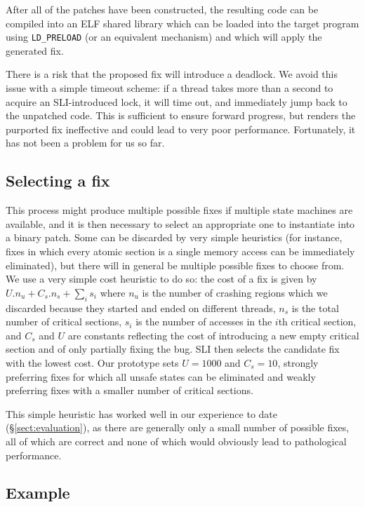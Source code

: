 \documentclass[10pt,letter,twocolumn]{sigplanconf}
\begin{document}
After all of the patches have been constructed, the resulting code can
be compiled into an ELF shared library which can be loaded into the
target program using \verb|LD_PRELOAD| (or an equivalent mechanism)
and which will apply the generated fix.  

There is a risk that the proposed fix will introduce a deadlock.  We
avoid this issue with a simple timeout scheme: if a thread takes more
than a second to acquire an SLI-introduced lock, it will time out, and
immediately jump back to the unpatched code.  This is sufficient to
ensure forward progress, but renders the purported fix ineffective and
could lead to very poor performance.  Fortunately, it has not been a
problem for us so far.

\subsection{Selecting a fix}
\label{sect:selectfix}

This process might produce multiple possible fixes if multiple state
machines are available, and it is then necessary to select an
appropriate one to instantiate into a binary patch.  Some can be
discarded by very simple heuristics (for instance, fixes in which
every atomic section is a single memory access can be immediately
eliminated), but there will in general be multiple possible fixes to
choose from.  We use a very simple cost heuristic to do so: the cost
of a fix is given by $U.n_u + C_s.n_s + {\sum_{i}}s_i$ where $n_u$ is
the number of crashing regions which we discarded because they started
and ended on different threads, $n_s$ is the total number of critical
sections, $s_i$ is the number of accesses in the $i$th critical
section, and $C_s$ and $U$ are constants reflecting the cost of
introducing a new empty critical section and of only partially fixing
the bug.  SLI then selects the candidate fix with the lowest cost.
Our prototype sets $U=1000$ and $C_s=10$, strongly preferring fixes
for which all unsafe states can be eliminated and weakly preferring
fixes with a smaller number of critical sections.

This simple heuristic has worked well in our experience to date
(\S\ref{sect:evaluation}), as there are generally only a small number
of possible fixes, all of which are correct and none of which would
obviously lead to pathological performance.

\subsection{Example}
\label{sect:final_example}
\end{document}
